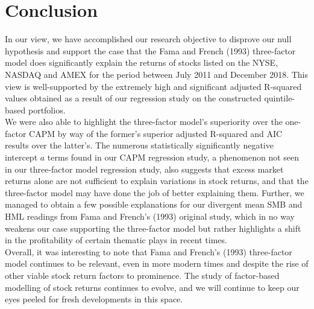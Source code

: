 \documentclass[12pt]{article}
\begin{document}
	\section{Conclusion} %
	\noindent In our view, we have accomplished our research objective to disprove our null hypothesis and support the case that the Fama and French (1993) three-factor model does significantly explain the returns of stocks listed on the NYSE, NASDAQ and AMEX for the period between July 2011 and December 2018. This view is well-supported by the extremely high and significant adjusted R-squared values obtained as a result of our regression study on the constructed quintile-based portfolios.\\
	
	\noindent We were also able to highlight the three-factor model's superiority over the one-factor CAPM by way of the former's superior adjusted R-squared and AIC results over the latter's. The numerous statistically significantly negative intercept $a$ terms found in our CAPM regression study, a phenomenon not seen in our three-factor model regression study, also suggests that excess market returns alone are not sufficient to explain variations in stock returns, and that the three-factor model may have done the job of better explaining them. Further, we managed to obtain a few possible explanations for our divergent mean SMB and HML readings from Fama and French's (1993) original study, which in no way weakens our case supporting the three-factor model but rather highlights a shift in the profitability of certain thematic plays in recent times.\\
	
	\noindent Overall, it was interesting to note that Fama and French's (1993) three-factor model continues to be relevant, even in more modern times and despite the rise of other viable stock return factors to prominence. The study of factor-based modelling of stock returns continues to evolve, and we will continue to keep our eyes peeled for fresh developments in this space.
	
	\newpage
\end{document}

